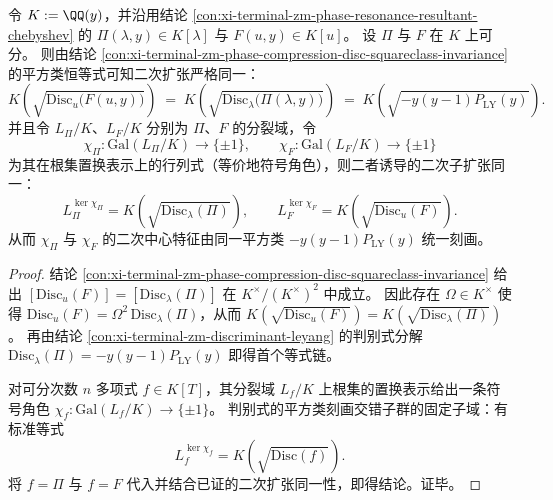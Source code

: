\begin{theorem}[判别式平方类锁定的同一二次中心特征]\label{thm:xi-terminal-zm-leyang-phase-resonance-discriminant-center-character}
令 \(K:=\QQ(y)\)，并沿用结论 \ref{con:xi-terminal-zm-phase-resonance-resultant-chebyshev} 的
\(\Pi(\lambda,y)\in K[\lambda]\) 与 \(F(u,y)\in K[u]\)。
设 \(\Pi\) 与 \(F\) 在 \(K\) 上可分。
则由结论 \ref{con:xi-terminal-zm-phase-compression-disc-squareclass-invariance} 的平方类恒等式可知二次扩张严格同一：
\[
K\!\left(\sqrt{\mathrm{Disc}_{u}\bigl(F(u,y)\bigr)}\right)
\;=\;
K\!\left(\sqrt{\mathrm{Disc}_{\lambda}\bigl(\Pi(\lambda,y)\bigr)}\right)
\;=\;
K\!\left(\sqrt{-y(y-1)P_{\mathrm{LY}}(y)}\right).
\]
并且令 \(L_\Pi/K\)、\(L_F/K\) 分别为 \(\Pi\)、\(F\) 的分裂域，令
\[
\chi_\Pi:\mathrm{Gal}(L_\Pi/K)\to\{\pm 1\},\qquad
\chi_F:\mathrm{Gal}(L_F/K)\to\{\pm 1\}
\]
为其在根集置换表示上的行列式（等价地符号角色），则二者诱导的二次子扩张同一：
\[
L_\Pi^{\ker\chi_\Pi}=K\!\left(\sqrt{\mathrm{Disc}_{\lambda}(\Pi)}\right),
\qquad
L_F^{\ker\chi_F}=K\!\left(\sqrt{\mathrm{Disc}_{u}(F)}\right).
\]
从而 \(\chi_\Pi\) 与 \(\chi_F\) 的二次中心特征由同一平方类 \(-y(y-1)P_{\mathrm{LY}}(y)\) 统一刻画。
\end{theorem}
\begin{proof}
结论 \ref{con:xi-terminal-zm-phase-compression-disc-squareclass-invariance} 给出
\(
[\mathrm{Disc}_{u}(F)]=[\mathrm{Disc}_{\lambda}(\Pi)]
\)
在 \(K^\times/(K^\times)^2\) 中成立。
因此存在 \(\Omega\in K^\times\) 使得
\(
\mathrm{Disc}_{u}(F)=\Omega^2\,\mathrm{Disc}_{\lambda}(\Pi)
\)，从而
\(
K(\sqrt{\mathrm{Disc}_{u}(F)})=K(\sqrt{\mathrm{Disc}_{\lambda}(\Pi)})
\)。
再由结论 \ref{con:xi-terminal-zm-discriminant-leyang} 的判别式分解
\(
\mathrm{Disc}_{\lambda}(\Pi)=-y(y-1)P_{\mathrm{LY}}(y)
\)
即得首个等式链。
\par
对可分次数 \(n\) 多项式 \(f\in K[T]\)，其分裂域 \(L_f/K\) 上根集的置换表示给出一条符号角色
\(\chi_f:\mathrm{Gal}(L_f/K)\to\{\pm 1\}\)。
判别式的平方类刻画交错子群的固定子域：有标准等式
\[
L_f^{\ker\chi_f}=K\!\left(\sqrt{\mathrm{Disc}(f)}\right).
\]
将 \(f=\Pi\) 与 \(f=F\) 代入并结合已证的二次扩张同一性，即得结论。证毕。
\end{proof}

